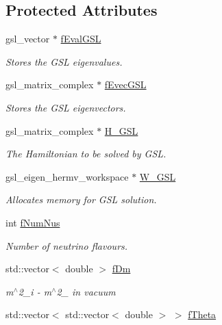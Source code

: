 \subsection*{Protected Attributes}
\begin{DoxyCompactItemize}
\item 
gsl\+\_\+vector $\ast$ \hyperlink{classOscProb_1_1PMNS__Sterile_abdcb0a144aadef0239dfb36ed4ed0297}{f\+Eval\+G\+SL}
\begin{DoxyCompactList}\small\item\em Stores the G\+SL eigenvalues. \end{DoxyCompactList}\item 
gsl\+\_\+matrix\+\_\+complex $\ast$ \hyperlink{classOscProb_1_1PMNS__Sterile_a8ab71bc7de328eb6ba855904f365fb1d}{f\+Evec\+G\+SL}
\begin{DoxyCompactList}\small\item\em Stores the G\+SL eigenvectors. \end{DoxyCompactList}\item 
gsl\+\_\+matrix\+\_\+complex $\ast$ \hyperlink{classOscProb_1_1PMNS__Sterile_aeff790051925a3135b7529ced67e81ab}{H\+\_\+\+G\+SL}
\begin{DoxyCompactList}\small\item\em The Hamiltonian to be solved by G\+SL. \end{DoxyCompactList}\item 
gsl\+\_\+eigen\+\_\+hermv\+\_\+workspace $\ast$ \hyperlink{classOscProb_1_1PMNS__Sterile_a4e8aed8fd29297e4833488572c9a4eb1}{W\+\_\+\+G\+SL}
\begin{DoxyCompactList}\small\item\em Allocates memory for G\+SL solution. \end{DoxyCompactList}\item 
int \hyperlink{classOscProb_1_1PMNS__Base_a24bb74bed63569dfe88b18fa6a08060e}{f\+Num\+Nus}
\begin{DoxyCompactList}\small\item\em Number of neutrino flavours. \end{DoxyCompactList}\item 
std\+::vector$<$ double $>$ \hyperlink{classOscProb_1_1PMNS__Base_a406a31c3b5d620e5a0cace5b411f9f70}{f\+Dm}
\begin{DoxyCompactList}\small\item\em m$^\wedge$2\+\_\+i -\/ m$^\wedge$2\+\_ in vacuum \end{DoxyCompactList}\item 
std\+::vector$<$ std\+::vector$<$ double $>$ $>$ \hyperlink{classOscProb_1_1PMNS__Base_a1976887cd658dd86b2336c181f1470b4}{f\+Theta}

\end{DoxyCompactItemize}
